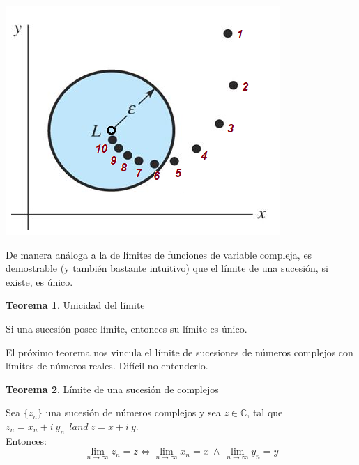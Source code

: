 \documentclass[12pt]{article}
\theoremstyle{definition}
\theoremstyle{theorem}
\newtheorem{theorem}{Teorema}[section]
\theoremstyle{corolary}
\theoremstyle{method}
\begin{document}
\begin{center}
	\includegraphics[scale=0.8]{limite.png}
\end{center}

De manera an\'aloga a la de l\'imites de funciones de variable compleja, es demostrable (y tambi\'en bastante intuitivo) que el l\'imite de una sucesi\'on, si existe, es \'unico.\\

\colorbox{red!40!white!80}{\parbox{\linewidth}{
\theoremstyle{theorem}
\begin{theorem} {Unicidad del l\'imite}

Si una sucesi\'on posee l\'imite, entonces su l\'imite es \'unico.
\end{theorem}}}
\linebreak
\linebreak

El pr\'oximo teorema nos vincula el l\'imite de sucesiones de n\'umeros complejos con l\'imites de n\'umeros reales. Dif\'icil no entenderlo.\\

\colorbox{red!40!white!80}{\parbox{\linewidth}{
\theoremstyle{theorem}
\begin{theorem} {L\'imite de una sucesi\'on de complejos}

Sea $\{z_n\}$ una sucesi\'on de n\'umeros complejos y sea $z\in \mathbb{C}$, tal que $z_n = x_n + i\ y_n\ \	land\ z=x+i\ y$.\\
Entonces: $$\lim\limits_{n\rightarrow \infty} z_n = z \Leftrightarrow \lim\limits_{n\rightarrow \infty}x_n = x\:\land\:\lim\limits_{n\rightarrow \infty}y_n = y$$
\end{theorem}}}
\linebreak
\linebreak
\end{document}
